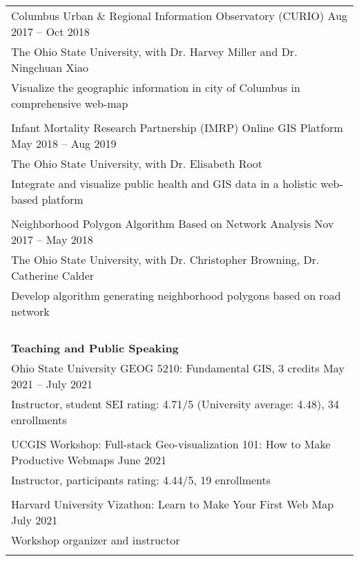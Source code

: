 \documentclass[letterpaper, 11pt]{article}
\begin{document}
\begin{longtable}{p{6.5in}}
Columbus Urban \& Regional Information Observatory (CURIO) \hfill Aug 2017 -- Oct 2018 \\
The Ohio State University, with Dr. Harvey Miller and Dr. Ningchuan Xiao \\
Visualize the geographic information in city of Columbus in comprehensive web-map \\\\

Infant Mortality Research Partnership (IMRP) Online GIS Platform \hfill May 2018 -- Aug 2019 \\
The Ohio State University, with Dr. Elisabeth Root \\
Integrate and visualize public health and GIS data in a holistic web-based platform \\\\

Neighborhood Polygon Algorithm Based on Network Analysis \hfill Nov 2017 -- May 2018 \\
The Ohio State University, with Dr. Christopher Browning, Dr. Catherine Calder \\
Develop algorithm generating neighborhood polygons based on road network \\\\


\\\\\\

\textbf{Teaching and Public Speaking} \\
Ohio State University GEOG 5210: Fundamental GIS, 3 credits \hfill May 2021 -- July 2021 \\
Instructor, student SEI rating: 4.71/5 (University average: 4.48), 34 enrollments \\\\

UCGIS Workshop: Full-stack Geo-visualization 101: How to Make Productive Webmaps \hfill June 2021 \\
Instructor, participants rating: 4.44/5, 19 enrollments \\\\

Harvard University Vizathon: Learn to Make Your First Web Map \hfill July 2021\\
Workshop organizer and instructor \\\\


\end{longtable}
\end{document}
